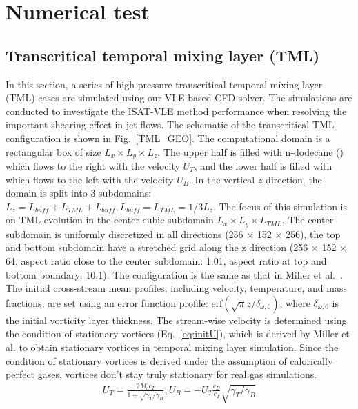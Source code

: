 \section{Numerical test}
\subsection{Transcritical temporal mixing layer (TML)}
\label{sec:TML}

In this section, a series of high-pressure transcritical temporal mixing layer (TML) cases are simulated using our VLE-based CFD solver. The simulations are conducted to investigate the ISAT-VLE method performance when resolving the important shearing effect in jet flows. The schematic of the transcritical TML configuration is shown in Fig.~\ref{TML_GEO}. The computational domain is a rectangular box of size $L_x \times L_y \times L_z$.
The upper half is filled with n-dodecane () which flows to the right with the velocity $U_T$, and the lower half is filled with  which flows to the left with the velocity $U_B$. In the vertical $z$ direction, the domain is split into 3 subdomains: $L_z = L_{buff}+L_{TML}+L_{buff}, L_{buff} = L_{TML} = 1/3 L_z$. The focus of this simulation is on TML evolution in the center cubic subdomain $L_x \times L_y \times L_{TML}$. The center subdomain is uniformly discretized in all directions (256 × 152 × 256), the top and bottom subdomain have a stretched grid along the z direction (256 × 152 × 64, aspect ratio close to the center subdomain: 1.01, aspect ratio at top and bottom boundary: 10.1). The configuration is the same as that in Miller et al.~\cite{miller2001direct}. The initial cross-stream mean profiles, including velocity, temperature, and mass fractions, are set using an error function profile: $\textrm{erf}(\sqrt{\pi}z/\delta_{\omega,0})$, where $\delta_{\omega,0}$ is the initial vorticity layer thickness. The stream-wise velocity is determined using the condition of stationary vortices (Eq.~\ref{eq:initU}), which is derived by Miller et al. \cite{miller2001direct} to obtain stationary vortices in temporal mixing layer simulation. Since the condition of stationary vortices is derived under the assumption of calorically perfect gases, vortices don't stay truly stationary for real gas simulations.
\begin{align} U_T = \frac{2M_c c_T}{1+\sqrt{\gamma_T/\gamma_B}},U_B = -U_T \frac{c_B}{c_T}\sqrt{\gamma_T/\gamma_B} \label{eq:initU} \end{align}

